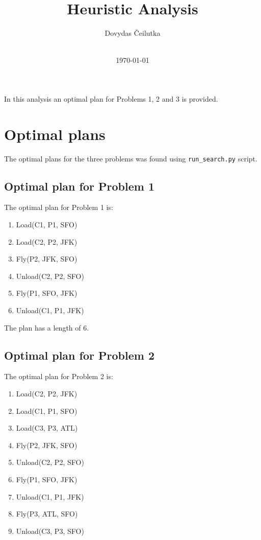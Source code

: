 \documentclass[11pt]{article}
\title{\vspace{-2.0cm}\textbf{Heuristic Analysis}}
\author{Dovydas Čeilutka\\\\}
\date{\today}
\begin{document}
\maketitle

In this analysis an optimal plan for Problems 1, 2 and 3 is provided.

\section{Optimal plans}

The optimal plans for the three problems was found using \texttt{run_search.py} script.

\subsection{Optimal plan for Problem 1}

The optimal plan for Problem 1 is:

\begin{enumerate}
  \item Load(C1, P1, SFO)
  \item Load(C2, P2, JFK)
  \item Fly(P2, JFK, SFO)
  \item Unload(C2, P2, SFO)
  \item Fly(P1, SFO, JFK)
  \item Unload(C1, P1, JFK)
\end{enumerate}

The plan has a length of 6.

\subsection{Optimal plan for Problem 2}

The optimal plan for Problem 2 is:

\begin{enumerate}
  \item Load(C2, P2, JFK)
  \item Load(C1, P1, SFO)
  \item Load(C3, P3, ATL)
  \item Fly(P2, JFK, SFO)
  \item Unload(C2, P2, SFO)
  \item Fly(P1, SFO, JFK)
  \item Unload(C1, P1, JFK)
  \item Fly(P3, ATL, SFO)
  \item Unload(C3, P3, SFO)
\end{enumerate}
\end{document}
